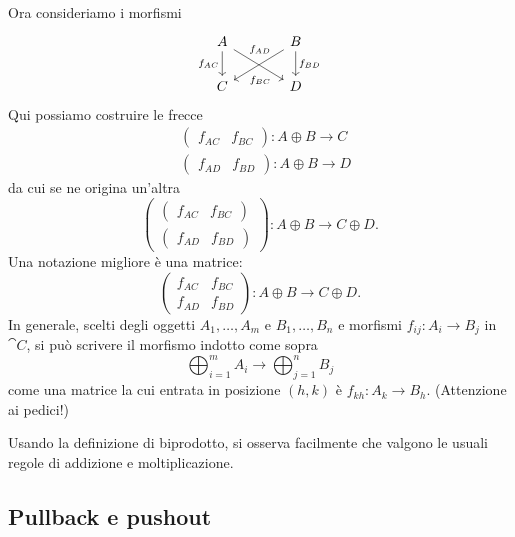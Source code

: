 Ora consideriamo i morfismi
\[
  \begin{tikzcd}[column sep=large]
    A \ar["{f_{AC}}", d, swap] \ar["{f_{AD}}" near start, dr] & B
    \ar["{f_{BC}}" near end, dl] \ar["{f_{BD}}", d] \\
    C & D
  \end{tikzcd}
\]
Qui possiamo costruire le frecce
\begin{align*}
  & \begin{pmatrix} f_{AC} & f_{BC} \end{pmatrix} : A \oplus B \to C \\
  & \begin{pmatrix} f_{AD} & f_{BD} \end{pmatrix} : A \oplus B \to D
\end{align*}
da cui se ne origina un'altra
\[
  \begin{pmatrix}
    \begin{pmatrix} f_{AC} & f_{BC} \end{pmatrix} \\
    \begin{pmatrix} f_{AD} & f_{BD} \end{pmatrix}
  \end{pmatrix} : A \oplus B \to C \oplus D .
\]
Una notazione migliore è una matrice:
\[
  \begin{pmatrix}
    f_{AC} & f_{BC} \\
    f_{AD} & f_{BD}
  \end{pmatrix} : A \oplus B \to C \oplus D .
\]
In generale, scelti degli oggetti \(A_1, \dots, A_m\) e
\(B_1, \dots, B_n\) e morfismi \(f_{ij} : A_i \to B_j\) in \(\cat C\),
si può scrivere il morfismo indotto come sopra
\[
  \bigoplus_{i=1}^m A_i \to \bigoplus_{j=1}^n B_j
\]
come una matrice la cui entrata in posizione \((h, k)\) è
\(f_{k h} : A_k \to B_h \). (Attenzione ai pedici!)

Usando la definizione di biprodotto, si osserva facilmente che valgono
le usuali regole di addizione e moltiplicazione.



\subsection{Pullback e pushout}

